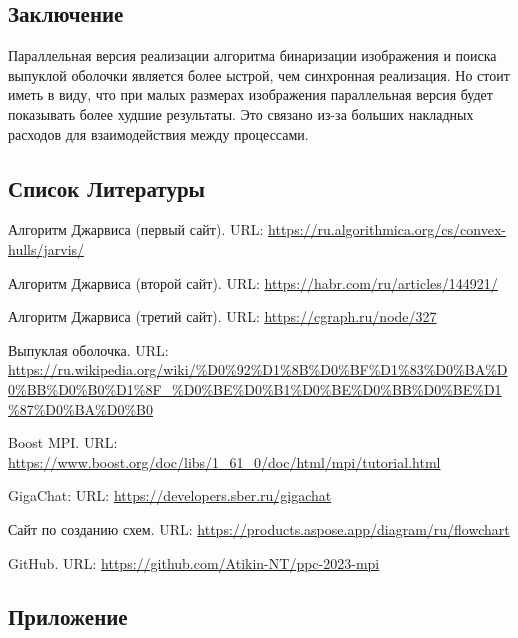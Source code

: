 \documentclass[a4paper, 12pt]{article}
\begin{document}
\newpage
\begin{center}
\section{Заключение}
\end{center}

Параллельная версия реализации алгоритма бинаризации изображения и поиска выпуклой оболочки является более ыстрой, чем синхронная реализация. Но стоит иметь в виду, что при малых размерах изображения параллельная версия будет показывать более худшие результаты. Это связано из-за больших накладных расходов для взаимодействия между процессами.

\newpage
\begin{center}
    \section{Список Литературы}
\end{center}

\begin{thebibliography}{8}
Алгоритм Джарвиса (первый сайт). URL: \url{https://ru.algorithmica.org/cs/convex-hulls/jarvis/}

Алгоритм Джарвиса (второй сайт). URL: \url{https://habr.com/ru/articles/144921/}

Алгоритм Джарвиса (третий сайт). URL: \url{https://cgraph.ru/node/327}

Выпуклая оболочка. URL: \url{https://ru.wikipedia.org/wiki/%D0%92%D1%8B%D0%BF%D1%83%D0%BA%D0%BB%D0%B0%D1%8F_%D0%BE%D0%B1%D0%BE%D0%BB%D0%BE%D1%87%D0%BA%D0%B0}

Boost MPI. URL: \url{https://www.boost.org/doc/libs/1_61_0/doc/html/mpi/tutorial.html}

GigaChat: URL: \url{https://developers.sber.ru/gigachat}

Сайт по созданию схем. URL: \url{https://products.aspose.app/diagram/ru/flowchart}

GitHub. URL: \url{https://github.com/Atikin-NT/ppc-2023-mpi}
\end{thebibliography}

\newpage
\begin{center}
    \section{Приложение}
\end{center}
\end{document}

